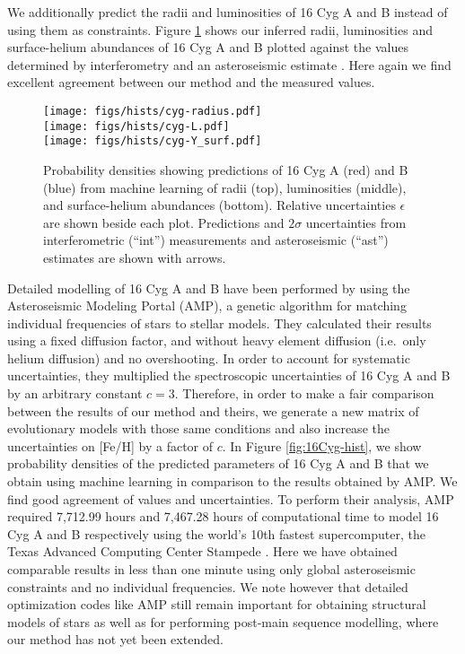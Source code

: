 \documentclass[manuscript]{aastex}
\begin{document}
We additionally predict the radii and luminosities of 16 Cyg A and B instead of using them as constraints. Figure \ref{fig:interferometry} shows our inferred radii, luminosities and surface-helium abundances of 16 Cyg A and B plotted against the values determined by interferometry \citep{2013MNRAS.433.1262W} and an asteroseismic estimate \citep{2014ApJ...790..138V}. Here again we find excellent agreement between our method and the measured values. 

\begin{figure}
    \centering
    \texttt{[image: figs/hists/cyg-radius.pdf]}\\
    \texttt{[image: figs/hists/cyg-L.pdf]}\\
    \texttt{[image: figs/hists/cyg-Y\_surf.pdf]}
    \caption{Probability densities showing predictions of 16 Cyg A (red) and B (blue) from machine learning of radii (top), luminosities (middle), and surface-helium abundances (bottom). Relative uncertainties $\epsilon$ are shown beside each plot. Predictions and $2\sigma$ uncertainties from interferometric (``int'') measurements and asteroseismic (``ast'') estimates are shown with arrows.}
    \label{fig:interferometry}
\end{figure}

Detailed modelling of 16 Cyg A and B have been performed  by \citet{2015ApJ...811L..37M} using the Asteroseismic Modeling Portal (AMP), a genetic algorithm for matching individual frequencies of stars to stellar models. They calculated their results using a fixed diffusion factor, and without heavy element diffusion (i.e.~only helium diffusion) and no overshooting. In order to account for systematic uncertainties, they multiplied the spectroscopic uncertainties of 16 Cyg A and B by an arbitrary constant $c=3$. Therefore, in order to make a fair comparison between the results of our method and theirs, we generate a new matrix of evolutionary models with those same conditions and also increase the uncertainties on [Fe/H] by a factor of $c$. In Figure \ref{fig:16Cyg-hist}, we show probability densities of the predicted parameters of 16 Cyg A and B that we obtain using machine learning in comparison to the results obtained by AMP. We find good agreement of values and uncertainties. To perform their analysis, AMP required 7,712.99 hours and 7,467.28 hours of computational time to model 16 Cyg A and B respectively using the world's 10th fastest supercomputer, the Texas Advanced Computing Center Stampede \citep{TOP500}. Here we have obtained comparable results in less than one minute using only global asteroseismic constraints and no individual frequencies. We note however that detailed optimization codes like AMP still remain important for obtaining structural models of stars as well as for performing post-main sequence modelling, where our method has not yet been extended. 
\end{document}
